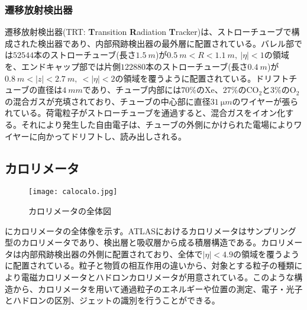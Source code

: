 \subsubsection{遷移放射検出器}
\label{sec:trt}
遷移放射検出器(TRT: \textbf{T}ransition \textbf{R}adiation \textbf{T}racker)は、ストローチューブで構成された検出器であり、内部飛跡検出器の最外層に配置されている。バレル部では$52544$本のストローチューブ(長さ$1.5\ \si{m}$)が$0.5\ \si{m} < R < 1.1\ \si{m},\ |\eta|<1$の領域を、エンドキャップ部では片側$122880$本のストローチューブ(長さ$0.4\ \si{m}$)が$0.8\ \si{m} < |z| < 2.7\ \si{m},\  < |\eta| < 2$の領域を覆うように配置されている。ドリフトチューブの直径は$4\ \si{mm}$であり、チューブ内部には$70\%$のXe、$27\%$のCO$_{2}$と$3\%$のO$_{2}$の混合ガスが充填されており、チューブの中心部に直径$31\ \si{\micro m}$のワイヤーが張られている。荷電粒子がストローチューブを通過すると、混合ガスをイオン化する。それにより発生した自由電子は、チューブの外側にかけられた電場によりワイヤーに向かってドリフトし、読み出しされる。



\subsection{カロリメータ}
\label{sec:calocalo}
\begin{figure}[tbp]
  \centering
  \texttt{[image: calocalo.jpg]}
  \caption[ATLASカロリメータ]{カロリメータの全体図 \cite{calocalo} }
  \label{fig:calocalo}
\end{figure}

にカロリメータの全体像を示す。ATLASにおけるカロリメータはサンプリング型のカロリメータであり、検出層と吸収層から成る積層構造である。カロリメータは内部飛跡検出器の外側に配置されており、全体で$|\eta|<4.9$の領域を覆うように配置されている。粒子と物質の相互作用の違いから、対象とする粒子の種類により電磁カロリメータとハドロンカロリメータが用意されている。このような構造から、カロリメータを用いて通過粒子のエネルギーや位置の測定、電子・光子とハドロンの区別、ジェットの識別を行うことができる。

